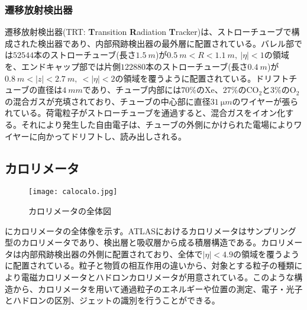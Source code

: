 \subsubsection{遷移放射検出器}
\label{sec:trt}
遷移放射検出器(TRT: \textbf{T}ransition \textbf{R}adiation \textbf{T}racker)は、ストローチューブで構成された検出器であり、内部飛跡検出器の最外層に配置されている。バレル部では$52544$本のストローチューブ(長さ$1.5\ \si{m}$)が$0.5\ \si{m} < R < 1.1\ \si{m},\ |\eta|<1$の領域を、エンドキャップ部では片側$122880$本のストローチューブ(長さ$0.4\ \si{m}$)が$0.8\ \si{m} < |z| < 2.7\ \si{m},\  < |\eta| < 2$の領域を覆うように配置されている。ドリフトチューブの直径は$4\ \si{mm}$であり、チューブ内部には$70\%$のXe、$27\%$のCO$_{2}$と$3\%$のO$_{2}$の混合ガスが充填されており、チューブの中心部に直径$31\ \si{\micro m}$のワイヤーが張られている。荷電粒子がストローチューブを通過すると、混合ガスをイオン化する。それにより発生した自由電子は、チューブの外側にかけられた電場によりワイヤーに向かってドリフトし、読み出しされる。



\subsection{カロリメータ}
\label{sec:calocalo}
\begin{figure}[tbp]
  \centering
  \texttt{[image: calocalo.jpg]}
  \caption[ATLASカロリメータ]{カロリメータの全体図 \cite{calocalo} }
  \label{fig:calocalo}
\end{figure}

にカロリメータの全体像を示す。ATLASにおけるカロリメータはサンプリング型のカロリメータであり、検出層と吸収層から成る積層構造である。カロリメータは内部飛跡検出器の外側に配置されており、全体で$|\eta|<4.9$の領域を覆うように配置されている。粒子と物質の相互作用の違いから、対象とする粒子の種類により電磁カロリメータとハドロンカロリメータが用意されている。このような構造から、カロリメータを用いて通過粒子のエネルギーや位置の測定、電子・光子とハドロンの区別、ジェットの識別を行うことができる。

